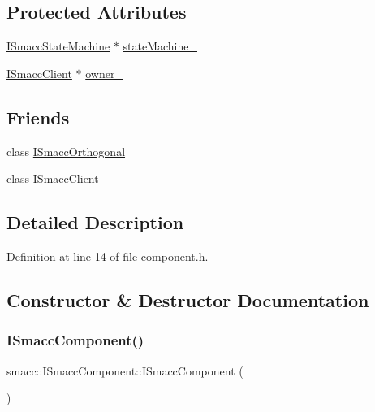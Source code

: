 \subsection*{Protected Attributes}
\begin{DoxyCompactItemize}
\item 
\hyperlink{classsmacc_1_1ISmaccStateMachine}{I\+Smacc\+State\+Machine} $\ast$ \hyperlink{classsmacc_1_1ISmaccComponent_ae3f37acc1679f79299b86872d4b1f80f}{state\+Machine\+\_\+}
\item 
\hyperlink{classsmacc_1_1ISmaccClient}{I\+Smacc\+Client} $\ast$ \hyperlink{classsmacc_1_1ISmaccComponent_a909590e672450ce0eb0d8facb45c737a}{owner\+\_\+}
\end{DoxyCompactItemize}
\subsection*{Friends}
\begin{DoxyCompactItemize}
\item 
class \hyperlink{classsmacc_1_1ISmaccComponent_a7205cc84a71fea903124d54d01e99a68}{I\+Smacc\+Orthogonal}
\item 
class \hyperlink{classsmacc_1_1ISmaccComponent_a64e981df7a9da02075b7668b3391ca1e}{I\+Smacc\+Client}
\end{DoxyCompactItemize}


\subsection{Detailed Description}


Definition at line 14 of file component.\+h.



\subsection{Constructor \& Destructor Documentation}
\mbox{\label{classsmacc_1_1ISmaccComponent_a43952d7269ddb81d017a80f018fe502e}} 
\subsubsection{\texorpdfstring{I\+Smacc\+Component()}{ISmaccComponent()}}
{\footnotesize\ttfamily smacc\+::\+I\+Smacc\+Component\+::\+I\+Smacc\+Component (\begin{DoxyParamCaption}{ }\end{DoxyParamCaption})}



